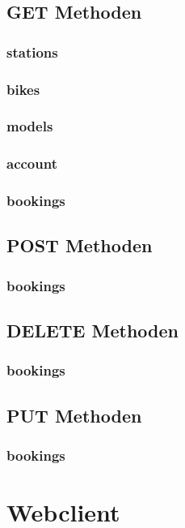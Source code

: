 \section{GET Methoden}
\subsection{stations}

\subsection{bikes}

\subsection{models}

\subsection{account}

\subsection{bookings}

\section{POST Methoden}
\subsection{bookings}

\section{DELETE Methoden}
\subsection{bookings}

\section{PUT Methoden}
\subsection{bookings}


\chapter{Webclient}

